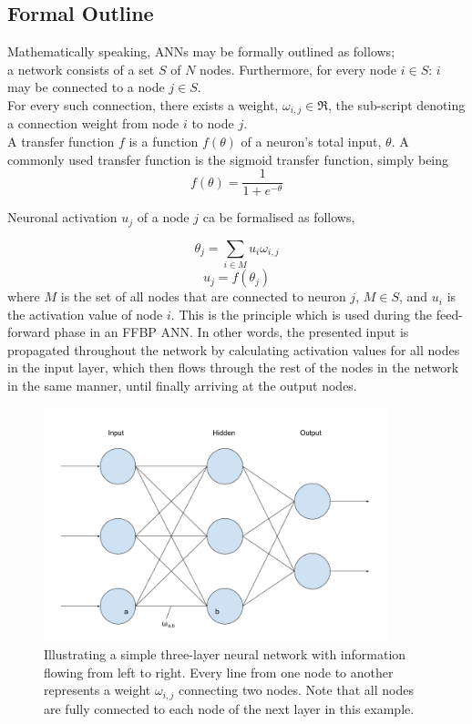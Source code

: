 \subsection{Formal Outline}
Mathematically speaking, ANNs may be formally outlined as follows;
\\
a network consists of a set $S$ of $N$ nodes. Furthermore, for every node $i\in S$: $i$ may be connected to a node $j \in S$.
\\
For every such connection, there exists a weight, $\omega_{i,j} \in \Re$, the sub-script denoting a connection weight from node $i$ to node $j$.
\\
A transfer function $f$ is a function $f(\theta)$ of a neuron's total input, $\theta$. A commonly used transfer function is the sigmoid transfer function, simply being 
\begin{equation}\label{sigmoid}
    f(\theta) = \frac{1}{1+e^{-\theta}}
\end{equation}

Neuronal activation $u_j$ of a node $j$ ca be formalised as follows,

\begin{equation}\label{input}
    \theta_j = \sum_{i\in M} u_i \omega_{i,j}
\end{equation}
\begin{equation}\label{activation}
    u_j = f(\theta_j)
\end{equation}
where $M$ is the set of all nodes that are connected to neuron $j$, $M \in S$, and $u_i$ is the activation value of node $i$. This is the principle which is used during the feed-forward phase in an FFBP ANN. In other words, the presented input is propagated throughout the network by calculating activation values for all nodes in the input layer, which then flows through the rest of the nodes in the network in the same manner, until finally arriving at the output nodes.

\begin{figure}
\centering
\includegraphics[width=10cm]{fig/three_layer_ann}
\caption{Illustrating a simple three-layer neural network with information flowing from left to right. Every line from one node to another represents a weight $\omega_{i,j}$ connecting two nodes. Note that all nodes are fully connected to each node of the next layer in this example.}
\label{fig:three_layer_ann}
\end{figure}

